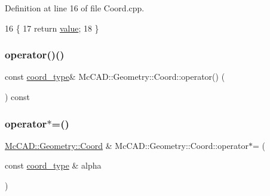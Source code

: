 Definition at line 16 of file Coord.\+cpp.


\begin{DoxyCode}
16                                     \{
17     \textcolor{keywordflow}{return} \hyperlink{classMcCAD_1_1Geometry_1_1Coord_a540aea93d3b1a9cfd505e1e0b96b2b91}{value};
18 \}
\end{DoxyCode}
\mbox{\label{classMcCAD_1_1Geometry_1_1Coord_a05901521bdd4270059a1f673a8a588e0}} 
\subsubsection{\texorpdfstring{operator()()}{operator()()}\hspace{0.1cm}{\footnotesize\ttfamily [2/2]}}
{\footnotesize\ttfamily const \hyperlink{namespaceMcCAD_1_1Geometry_ac043b37a4a7e849fca22869e1982d2f8}{coord\+\_\+type}\& Mc\+C\+A\+D\+::\+Geometry\+::\+Coord\+::operator() (\begin{DoxyParamCaption}{ }\end{DoxyParamCaption}) const}

\mbox{\label{classMcCAD_1_1Geometry_1_1Coord_ad46163aab81deb219f43e3776e6b2e0b}} 
\subsubsection{\texorpdfstring{operator$\ast$=()}{operator*=()}\hspace{0.1cm}{\footnotesize\ttfamily [1/2]}}
{\footnotesize\ttfamily \hyperlink{classMcCAD_1_1Geometry_1_1Coord}{Mc\+C\+A\+D\+::\+Geometry\+::\+Coord} \& Mc\+C\+A\+D\+::\+Geometry\+::\+Coord\+::operator$\ast$= (\begin{DoxyParamCaption}\item[{const \hyperlink{namespaceMcCAD_1_1Geometry_ac043b37a4a7e849fca22869e1982d2f8}{coord\+\_\+type} \&}]{alpha }\end{DoxyParamCaption})}



